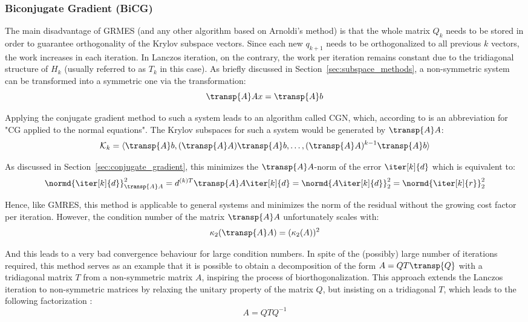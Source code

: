 \subsubsection{Biconjugate Gradient (BiCG)}
\label{sec:bicg}
The main disadvantage of GRMES (and any other algorithm based on Arnoldi's method) is that the whole matrix $Q_k$ needs to be stored in order to guarantee orthogonality of the Krylov subspace vectors. Since each new $q_{k+1}$ needs to be orthogonalized to all previous $k$ vectors, the work increases in each iteration. In Lanczos iteration, on the contrary, the work per iteration remains constant due to the tridiagonal structure of $H_k$ (usually referred to as $T_k$ in this case). As briefly discussed in Section~\hyperref[sec:subspace_methods]{\ref{sec:subspace_methods}}, a non-symmetric system can be transformed into a symmetric one via the transformation:
\begin{equation}
    \transp{A}Ax=\transp{A}b
\end{equation}

\noindent Applying the conjugate gradient method to such a system leads to an algorithm called CGN, which, according to \cite{trefethen_numerical_1997} is an abbreviation for "CG applied to the normal equations". The Krylov subspaces for such a system would be generated by $\transp{A}A$:
\begin{equation}
    \mathcal{K}_k = \langle \transp{A}b, (\transp{A}A)\transp{A}b, \dots, (\transp{A}A)^{k-1}\transp{A}b\rangle
\end{equation}

\noindent As discussed in Section~\hyperref[sec:conjugate_gradient]{\ref{sec:conjugate_gradient}}, this minimizes the $\transp{A}A$-norm of the error $\iter[k]{d}$ which is equivalent to:
\begin{equation}
    \normd{\iter[k]{d}}_{\transp{A}A}^2 = d^{(k)T}\transp{A}A\iter[k]{d}=\normd{
    A\iter[k]{d}}_2^2 = \normd{\iter[k]{r}}_2^2
\end{equation}

\noindent Hence, like GMRES, this method is applicable to general systems and minimizes the norm of the residual without the growing cost factor per iteration. However, the condition number of the matrix $\transp{A}A$ unfortunately scales with:
\begin{equation}
    \kappa_2(\transp{A}A) = (\kappa_2(A))^2
\end{equation}

\noindent And this leads to a very bad convergence behaviour for large condition numbers. In spite of the (possibly) large number of iterations required, this method serves as an example that it is possible to obtain a decomposition of the form $A=QT \transp{Q}$  with a tridiagonal matrix $T$ from a non-symmetric matrix $A$, inspiring the process of biorthogonalization. 
This approach extends the Lanczos iteration to non-symmetric matrices by relaxing the unitary property of the matrix $Q$, but insisting on a tridiagonal $T$, which leads to the following factorization \cite{golub_matrix_2013}:
\begin{equation}
    A=QTQ^{-1}
\end{equation}

